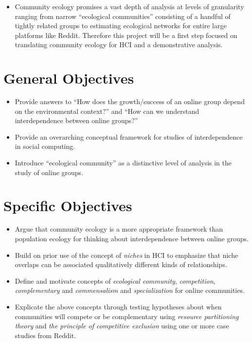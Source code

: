 \documentclass[12pt]{memoir}
\begin{document}
\begin{itemize}
\item Community ecology promises a vast depth of analysis at levels of granularity ranging from narrow ``ecological communities'' consisting of a handful of tightly related groups to estimating ecological networks for entire large platforms like Reddit.  Therefore this project will be a first step focused on translating community ecology for HCI and a demonstrative analysis.

\end{itemize}

\section{General Objectives}

\begin{itemize}
\item Provide answers to ``How does the growth/success of an online group depend on the environmental context?''  and ``How can we understand interdependence between online groups?''

\item Provide an overarching conceptual framework for studies of interdependence in social computing.

\item Introduce ``ecological community'' as a distinctive level of analysis in the study of online groups.

\end{itemize}

\section{Specific Objectives}
\begin{itemize}

\item Argue that community ecology is a more appropriate framework than population ecology for thinking about interdependence between online groups.

\item Build on prior use of the concept of \emph{niches} in HCI to emphasize that niche overlaps can be associated qualitatively different kinds of relationships.   

\item Define and motivate concepts of \emph{ecological community}, \emph{competition}, \emph{complementary} and \emph{commensalism} and \emph{specialization} for online communities.

\item Explicate the above concepts through testing hypotheses about when communities will compete or be complementary using \emph{resource partitioning theory} and \emph{the principle of competitive exclusion} using one or more case studies from Reddit.

\end{itemize}
\end{document}
